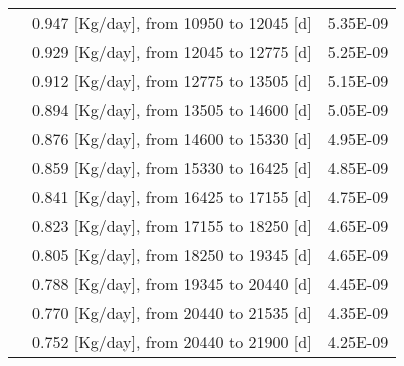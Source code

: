 \begin{longtable}{|p{}|p{}|p{}|}
		&   0.947  [Kg/day], from 10950 to 12045 [d] &	5.35E-09 \\
		& 0.929  [Kg/day], from 12045 to 12775 [d] &	5.25E-09 \\
		&  0.912   [Kg/day], from 12775 to 13505 [d] &	5.15E-09 \\
		&   0.894  [Kg/day], from 13505 to 14600 [d] &	5.05E-09 \\
		&  0.876 [Kg/day], from 14600 to 15330 [d] &	4.95E-09 \\
		& 0.859   [Kg/day], from 15330 to 16425 [d] &	4.85E-09 \\
		&  0.841 [Kg/day], from 16425 to 17155 [d] &	4.75E-09 \\
		&  0.823 [Kg/day], from 17155 to 18250 [d] &	4.65E-09 \\
		&  0.805 [Kg/day], from 18250 to 19345 [d] &	4.65E-09 \\
		& 0.788  [Kg/day], from 19345 to 20440 [d] &	4.45E-09 \\
		&  0.770 [Kg/day], from 20440 to 21535 [d] &	4.35E-09 \\
		& 0.752 [Kg/day], from 20440 to 21900 [d] &	4.25E-09 \\
		\hline
\end{longtable}	
